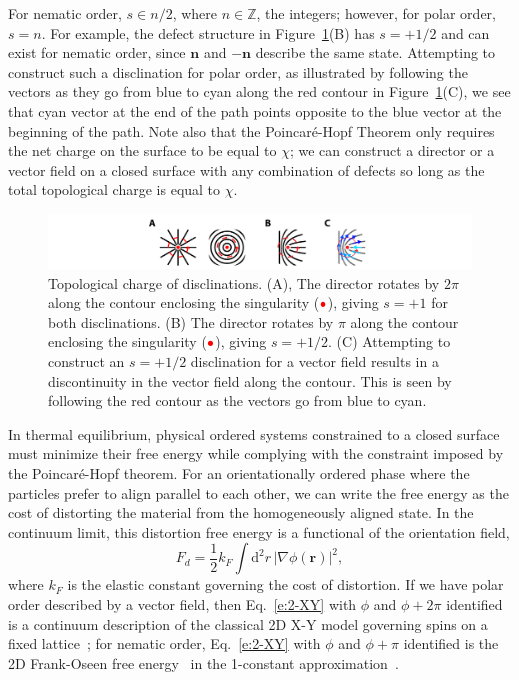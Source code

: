 For nematic order, $s \in n/2$, where $n \in \mathbb{Z}$, the integers; however, for polar order, $s = n$.
For example, the defect structure in Figure~\ref{f:1-TopCharge}(B) has $s = +1/2$ and can exist for nematic order, since $\mathbf{n}$ and $\mathbf{-n}$ describe the same state.
Attempting to construct such a disclination for polar order, as illustrated by following the vectors as they go from blue to cyan along the red contour in Figure~\ref{f:1-TopCharge}(C), we see that cyan vector at the end of the path points opposite to the blue vector at the beginning of the path.
Note also that the Poincar\'e-Hopf Theorem only requires the net charge on the surface to be equal to $\chi$; we can construct a director or a vector field on a closed surface with any combination of defects so long as the total topological charge is equal to $\chi$.
\begin{figure}
  \centering
  \includegraphics{figures/C1/Ch1-Figs_TopCharge.png}
  \caption{Topological charge of disclinations.
  (A), The director rotates by $2\pi$ along the contour enclosing the singularity (${\color{red} \bullet}$), giving $s = +1$ for both disclinations.
  (B) The director rotates by $\pi$ along the contour enclosing the singularity (${\color{red} \bullet}$), giving $s = +1/2$.
  (C) Attempting to construct an $s = +1/2$ disclination for a vector field results in a discontinuity in the vector field along the contour.
  This is seen by following the red contour as the vectors go from blue to cyan.}\label{f:1-TopCharge}
\end{figure}

In thermal equilibrium, physical ordered systems constrained to a closed surface must minimize their free energy while complying with the constraint imposed by the Poincar\'e-Hopf theorem.
For an orientationally ordered phase where the particles prefer to align parallel to each other, we can write the free energy as the cost of distorting the material from the homogeneously aligned state.
In the continuum limit, this distortion free energy is a functional of the orientation field,
\begin{equation}
  F_d = \frac{1}{2} k_F \int \textrm{d}^2r \, |\nabla \phi(\mathbf{r})|^2,\label{e:2-XY}
\end{equation}
where $k_F$ is the elastic constant governing the cost of distortion.
If we have polar order described by a vector field, then Eq.~\ref{e:2-XY} with $\phi$ and $\phi + 2\pi$ identified is a continuum description of the classical 2D X-Y model governing spins on a fixed lattice~\cite{RN175}; for nematic order, Eq.~\ref{e:2-XY} with $\phi$ and $\phi + \pi$ identified is the 2D Frank-Oseen free energy~\cite{RN61} in the 1-constant approximation~\cite{RN33}.

